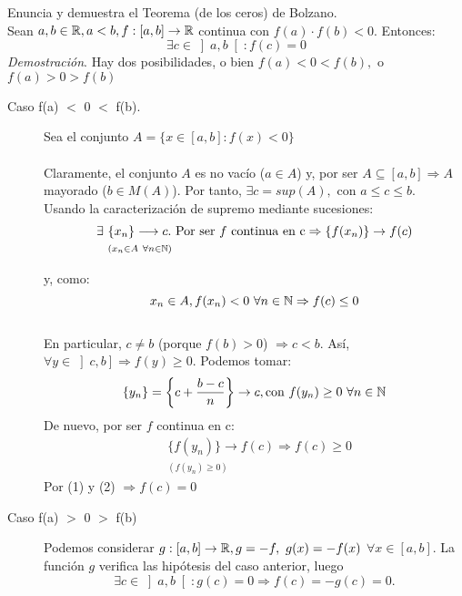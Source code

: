 \documentclass[12pt]{article}
\begin{document}
    \begin{ejercicio} Enuncia y demuestra el Teorema (de los ceros) de Bolzano. \\

        \noindent
        Sean $a, b \in {\mathbb{R}}, a < b, f:[a, b] \rightarrow {\mathbb{R}}$ continua con $f(a) \cdot f(b) < 0$. Entonces:
        \begin{equation*}
            \exists c \in \left]a, b\right[ \colon f(c) = 0
        \end{equation*}
        \textit{Demostración}. Hay dos posibilidades, o bien $f(a) < 0 < f(b),$ o $f(a) > 0 > f(b)$
        \begin{description}
            \item[Caso f(a) $<$ 0 $<$ f(b).] Sea el conjunto $A = \{x \in [a,b]: f(x) < 0\}$ \\\\
            Claramente, el conjunto $A$ es no vacío ($a \in A$) y, por ser $A \subseteq [a, b] \Rightarrow A$ mayorado ($b \in M(A)$). Por tanto, $\exists c = sup(A),$ con $a \leq c \leq b$. \\ Usando la caracterización de supremo mediante sucesiones:
            \begin{align*}
                 \exists  \ & \{x_n\} \longrightarrow c. \text{ Por ser $f$ continua en c} \Rightarrow \{f(x_n)\} \rightarrow f(c) \\
                & ^{(x_n \in A \ \forall n \in {\mathbb{N}})}
            \end{align*}
            y, como:
            \begin{equation}
                x_n \in A, f(x_n) < 0 \ \forall n \in {\mathbb{N}} \Rightarrow f(c) \leq 0
            \end{equation} \\
            En particular, $c \neq b$ (porque $f(b) > 0$) $\Rightarrow c < b$.
            Así, $\forall y \in \left]c, b\right] \Rightarrow f(y) \geq 0$. Podemos tomar:
            \begin{equation*}
                \{y_n\} = \left\{c + \frac{b-c}{n}\right\} \rightarrow c, \text{con } f(y_n) \geq 0 \ \forall n \in {\mathbb{N}}
            \end{equation*}
            De nuevo, por ser $f$ continua en c:
            \begin{align}
                &\{f(y_n)\} \rightarrow f(c) \Rightarrow f(c) \geq 0  \\
                & ^{(f(y_n) \geq 0)} \nonumber
            \end{align}
            Por (1) y (2) $\Rightarrow \boxed{f(c) = 0}$
        \item[Caso f(a) $>$ 0 $>$ f(b)] Podemos considerar $g:[a, b] \rightarrow {\mathbb{R}}, g = -f , \ g(x) = -f(x)$ ${\forall x \in [a, b]}$.
            La función $g$ verifica las hipótesis del caso anterior, luego
            \begin{equation*}
                \exists c \in \left]a, b\right[: g(c) = 0 \Rightarrow f(c) = -g(c) = 0.
            \end{equation*}
        \end{description}
    \end{ejercicio}
    
\end{document}
